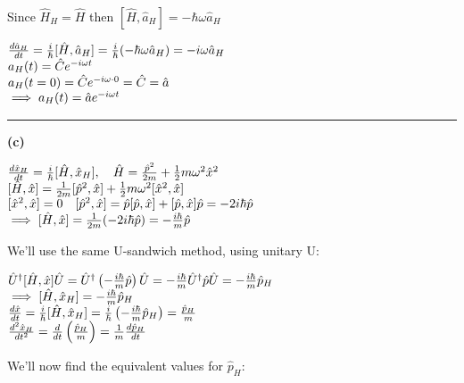 \documentclass[14pt]{extarticle}
\makeatletter
\newenvironment{lefteqs}{%
    \begin{flushleft}%
    \renewcommand{\arraystretch}{1.3}%
    $\begin{array}{@{}l@{}}%
}{%
    \end{array}$%
    \end{flushleft}%
}
\makeatother
\begin{document}
Since $\hat{H}_H = \hat{H}$ then $[\hat{H}, \hat{a}_H] = -\hbar \omega \hat{a}_H$

\begin{lefteqs}
    \frac{d \hat{a}_H}{dt} = \frac{i}{\hbar} [\hat{H}, \hat{a}_H] = \frac{i}{\hbar} (-\hbar \omega \hat{a}_H) = -i \omega \hat{a}_H \\
    a_H(t) = \hat{C} e^{-i \omega t} \\
    a_H(t=0) = \hat{C} e^{-i \omega \cdot 0} = \hat{C} = \hat{a}  \\
    \implies a_H(t) = \hat{a} e^{-i \omega t} 
\end{lefteqs}

\hrule
\vspace{2em}

\textbf{(c)}

\begin{lefteqs}
    \frac{d \hat{x}_H}{dt}
    = \frac{i}{\hbar} [\hat{H}, \hat{x}_H],
    \quad
    \hat{H} = \frac{\hat{p}^2}{2m} + \frac{1}{2} m \omega^2 \hat{x}^2 \\
    {}[\hat{H}, \hat{x}] = \frac{1}{2m} [\hat{p}^2, \hat{x}] + \frac{1}{2} m \omega^2 [\hat{x}^2, \hat{x}] \\
    {}[\hat{x}^2, \hat{x}] = 0 \quad [\hat{p}^2, \hat{x}] = \hat{p} [\hat{p}, \hat{x}] + [\hat{p}, \hat{x}] \hat{p} = -2 i \hbar \hat{p} \\
    \implies [\hat{H}, \hat{x}] = \frac{1}{2m} (-2 i \hbar \hat{p}) = -\frac{i \hbar}{m} \hat{p} 
\end{lefteqs}

We'll use the same U-sandwich method, using unitary U:

\begin{lefteqs}
\hat{U}^\dagger [\hat{H}, \hat{x}] \hat{U} = \hat{U}^\dagger \left( -\frac{i \hbar}{m} \hat{p} \right) \hat{U} = -\frac{i \hbar}{m} \hat{U}^\dagger \hat{p} \hat{U} = -\frac{i \hbar}{m} \hat{p}_H \\
    \implies [\hat{H}, \hat{x}_H] = -\frac{i \hbar}{m} \hat{p}_H \\
    \frac{d \hat{x}}{dt} = \frac{i}{\hbar} [\hat{H}, \hat{x}_H] = \frac{i}{\hbar} \left( -\frac{i \hbar}{m} \hat{p}_H \right) = \frac{\hat{p}_H}{m} \\
    \frac{d^2 \hat{x}_H}{dt^2} = \frac{d}{dt} \left( \frac{\hat{p}_H}{m} \right) = \frac{1}{m} \frac{d \hat{p}_H}{dt} \\
\end{lefteqs}

We'll now find the equivalent values for $\hat{p}_H$:
\end{document}
